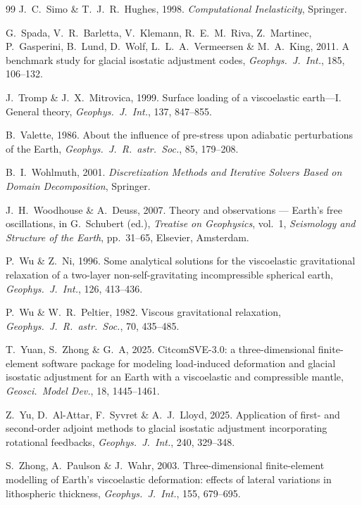 \documentclass[11pt]{article}
\numberwithin{equation}{section}
\theoremstyle{remark}
\begin{document}
\begin{thebibliography}{99}
J.~C.~Simo \& T.~J.~R.~Hughes, 1998.
\emph{Computational Inelasticity}, Springer.

G.~Spada, V.~R.~Barletta, V.~Klemann, R.~E.~M.~Riva, Z.~Martinec,
P.~Gasperini, B.~Lund, D.~Wolf, L.~L.~A.~Vermeersen \& M.~A.~King, 2011.
A benchmark study for glacial isostatic adjustment codes,
\emph{Geophys.\ J.\ Int.}, 185, 106--132.

J.~Tromp \& J.~X.~Mitrovica, 1999.
Surface loading of a viscoelastic earth---I. General theory,
\emph{Geophys.\ J.\ Int.}, 137, 847--855.

B.~Valette, 1986.
About the influence of pre-stress upon adiabatic perturbations of the
Earth, \emph{Geophys.\ J.\ R.\ astr.\ Soc.}, 85, 179--208.


B.~I.~Wohlmuth, 2001.
\emph{Discretization Methods and Iterative Solvers Based on Domain
Decomposition}, Springer.

J.~H.~Woodhouse \& A.~Deuss, 2007.
Theory and observations --- Earth's free oscillations, in
G.~Schubert (ed.), \emph{Treatise on Geophysics}, vol.~1, \emph{Seismology
and Structure of the Earth}, pp.~31--65, Elsevier, Amsterdam.

P.~Wu \& Z.~Ni, 1996.
Some analytical solutions for the viscoelastic gravitational relaxation of
a two-layer non-self-gravitating incompressible spherical earth,
\emph{Geophys.\ J.\ Int.}, 126, 413--436.

P.~Wu \& W.~R.~Peltier, 1982.
Viscous gravitational relaxation, \emph{Geophys.\ J.\ R.\ astr.\ Soc.}, 70,
435--485.

T.~Yuan, S.~Zhong \& G.~A, 2025.
CitcomSVE-3.0: a three-dimensional finite-element software package for
modeling load-induced deformation and glacial isostatic adjustment for an
Earth with a viscoelastic and compressible mantle,
\emph{Geosci.\ Model Dev.}, 18, 1445--1461.

Z.~Yu, D.~Al-Attar, F.~Syvret \& A.~J.~Lloyd, 2025.
Application of first- and second-order adjoint methods to glacial isostatic
adjustment incorporating rotational feedbacks,
\emph{Geophys.\ J.\ Int.}, 240, 329--348.

S.~Zhong, A.~Paulson \& J.~Wahr, 2003.
Three-dimensional finite-element modelling of Earth's viscoelastic
deformation: effects of lateral variations in lithospheric thickness,
\emph{Geophys.\ J.\ Int.}, 155, 679--695.

\end{thebibliography}
\end{document}
